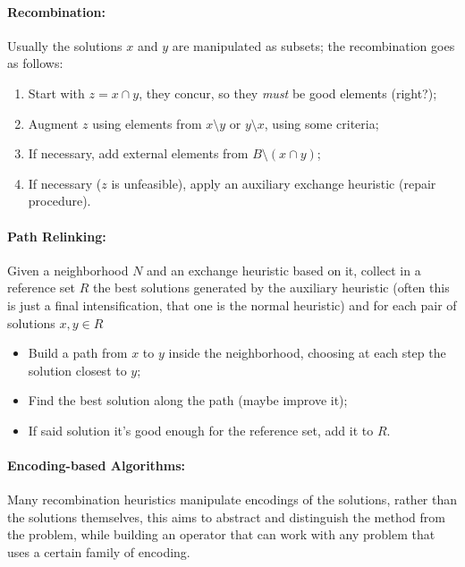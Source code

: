 \documentclass{article}
\begin{document}
	\paragraph{Recombination:} Usually the solutions $x$ and $y$ are manipulated as subsets; the recombination goes as follows: 
	\begin{enumerate}
		\item Start with $z = x \cap y$, they concur, so they \textit{must} be good elements (right?);
		\item Augment $z$ using elements from $x\setminus y$ or $y \setminus x$, using some criteria;
		\item If necessary, add external elements from $B \setminus (x \cap y)$;
		\item If necessary ($z$ is unfeasible), apply an auxiliary exchange heuristic (repair procedure).\\
	\end{enumerate}
	
	\paragraph{Path Relinking:} Given a neighborhood $N$ and an exchange heuristic based on it, collect in a reference set $R$ the best solutions generated by the auxiliary heuristic (often this is just a final intensification, that one is the normal heuristic) and for each pair of solutions $x,y \in R$
	\begin{itemize}
		\item Build a path from $x$ to $y$ inside the neighborhood, choosing at each step the solution closest to $y$;
		\item Find the best solution along the path (maybe improve it);
		\item If said solution it's good enough for the reference set, add it to $R$.\\
	\end{itemize}
	
	\paragraph{Encoding-based Algorithms:} Many recombination heuristics manipulate encodings of the solutions, rather than the solutions themselves, this aims to abstract and distinguish the method from the problem, while building an operator that can work with any problem that uses a certain family of encoding.\\
	
\end{document}

